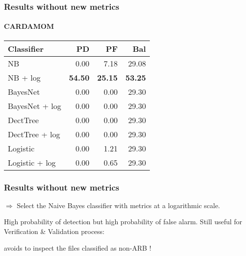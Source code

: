 \begin{frame}
 \frametitle{Results without new metrics}
 \framesubtitle{CARDAMOM}
 \begin{center}
 \begin{tabular}{lrrr}
  \hspace{0.2cm} Classifier & PD & PF & Bal\\
  \hline
  NB & 0.00 & 7.18 & 29.08\\
  NB + log &  \textbf{54.50} & \textbf{25.15} & \textbf{53.25}\\
  BayesNet & 0.00 & 0.00 & 29.30\\
  BayesNet + log & 0.00 & 0.00 & 29.30\\
  DectTree & 0.00 & 0.00 & 29.30\\
  DectTree + log & 0.00 & 0.00 & 29.30\\
  Logistic & 0.00 & 1.21 & 29.30\\
  Logistic + log & 0.00 & 0.65 & 29.30\\
  \hline
 \end{tabular}
 \end{center}
\end{frame}

\begin{frame}
 \frametitle{Results without new metrics}
 \begin{center}
  $\Longrightarrow$ \alert{Select the Naive Bayes classifier with metrics at a logarithmic scale.}
 \end{center}
 \vspace{1cm}
 High probability of detection but high probability of false alarm.
 Still useful for Verification \& Validation process:
 \begin{center}
  \alert{avoids to inspect the files classified as non-ARB !}
 \end{center}
\end{frame}
